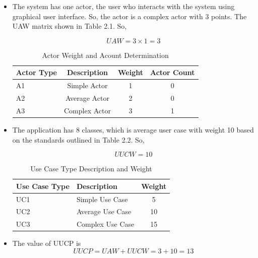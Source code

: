 \documentclass[english,12pt,a4paper]{report}
\begin{document}
	\begin{itemize}[leftmargin=*]
		\item The system has one actor, the user who interacts with the system using graphical user interface. So, the actor is a complex actor with 3 points. The UAW matrix shown in Table 2.1. So,
		
		\begin{equation}
			UAW = 3 \times 1 = 3
		\end{equation}
		
		\begin{table}[htbp]
			\centering
			\begin{tabular}{@{}lccc@{}}
				\toprule
				Actor Type & Description & Weight & Actor Count \\ 
				\midrule
				A1 & Simple Actor & 1 & 0 \\ 
				A2 & Average Actor & 2 & 0 \\ 
				A3 & Complex Actor & 3 & 1 \\
				\bottomrule
			\end{tabular}
			\caption{Actor Weight and Acount Determination}
			\label{tab:actor_weight}
		\end{table}
		
		\item The application has 8 classes, which is average user case with weight 10 based on the standards outlined in Table 2.2. So,
		
		\begin{equation}
			UUCW = 10
		\end{equation}
		
		\begin{table}[htbp]
			\centering
			\begin{tabular}{@{}llc@{}}
				\toprule
				Use Case Type & Description & Weight \\ 
				\midrule
				UC1 & Simple Use Case & 5 \\
				UC2 & Average Use Case & 10 \\
				UC3 & Complex Use Case & 15 \\
				\bottomrule
			\end{tabular}
			\caption{Use Case Type Description and Weight}
			\label{tab:use_case_weight}
		\end{table}
		
		
		\item The value of UUCP is
		\begin{equation}
			UUCP = UAW + UUCW = 3 + 10 = 13
		\end{equation}
	\end{itemize}
	
\end{document}
